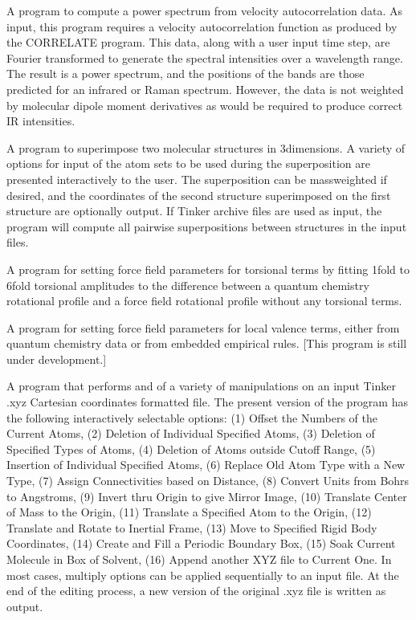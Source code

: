 \documentclass[letterpaper,11pt,english]{sphinxmanual}
\begin{document}

A program to compute a power spectrum from velocity autocorrelation data. As input, this program requires a velocity autocorrelation function as produced by the CORRELATE program. This data, along with a user input time step, are Fourier transformed to generate the spectral intensities over a wavelength range. The result is a power spectrum, and the positions of the bands are those predicted for an infrared or Raman spectrum. However, the data is not weighted by molecular dipole moment derivatives as would be required to produce correct IR intensities.


A program to superimpose two molecular structures in 3\sphinxhyphen{}dimensions. A variety of options for input of the atom sets to be used during the superposition are presented interactively to the user. The superposition can be mass\sphinxhyphen{}weighted if desired, and the coordinates of the second structure superimposed on the first structure are optionally output. If Tinker archive files are used as input, the program will compute all pairwise superpositions between structures in the input files.


A program for setting force field parameters for torsional terms by fitting 1\sphinxhyphen{}fold to 6\sphinxhyphen{}fold torsional amplitudes to the difference between a quantum chemistry rotational profile and a force field rotational profile without any torsional terms.


A program for setting force field parameters for local valence terms, either from quantum chemistry data or from embedded empirical rules. {[}This program is still under development.{]}


A program that performs and of a variety of manipulations on an input Tinker .xyz Cartesian coordinates formatted file. The present version of the program has the following interactively selectable options: (1) Offset the Numbers of the Current Atoms, (2) Deletion of Individual Specified Atoms, (3) Deletion of Specified Types of Atoms, (4) Deletion of Atoms outside Cutoff Range, (5) Insertion of Individual Specified Atoms, (6) Replace Old Atom Type with a New Type, (7) Assign Connectivities based on Distance, (8) Convert Units from Bohrs to Angstroms, (9) Invert thru Origin to give Mirror Image, (10) Translate Center of Mass to the Origin, (11) Translate a Specified Atom to the Origin, (12) Translate and Rotate to Inertial Frame, (13) Move to Specified Rigid Body Coordinates, (14) Create and Fill a Periodic Boundary Box, (15) Soak Current Molecule in Box of Solvent, (16) Append another XYZ file to Current One. In most cases, multiply options can be applied sequentially to an input file. At the end of the editing process, a new version of the original .xyz file is written as output.
\end{document}
